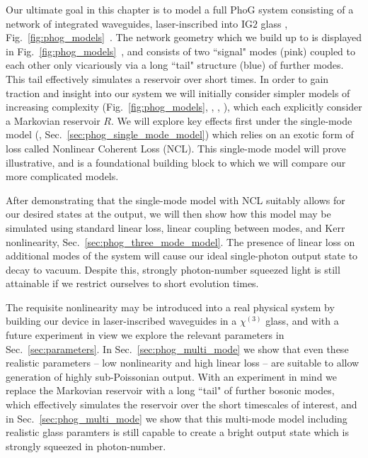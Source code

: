 Our ultimate goal in this chapter is to model a full PhoG system consisting of a network of integrated waveguides, laser-inscribed into IG$2$ glass \cite{ig2}, Fig.~\ref{fig:phog_models}~\MakeUppercase{}. The network geometry which we build up to is displayed in Fig.~\ref{fig:phog_models}~\MakeUppercase{}, and consists of two ``signal" modes (pink) coupled to each other only vicariously via a long ``tail" structure (blue) of further modes. This tail effectively simulates a reservoir over short times. In order to gain traction and insight into our system we will initially consider simpler models of increasing complexity (Fig.~\ref{fig:phog_models}, \MakeUppercase{}, \MakeUppercase{}, \MakeUppercase{}), which each explicitly consider a Markovian reservoir $R$. We will explore key effects first under the single-mode model (\MakeUppercase{}, Sec.~\ref{sec:phog_single_mode_model}) which relies on an exotic form of loss called Nonlinear Coherent Loss (NCL). This single-mode model will prove illustrative, and is a foundational building block to which we will compare our more complicated models.


After demonstrating that the single-mode model with NCL suitably allows for our desired states at the output, we will then show how this model may be simulated using standard linear loss, linear coupling between modes, and Kerr nonlinearity, Sec.~\ref{sec:phog_three_mode_model}. The presence of linear loss on additional modes of the system will cause our ideal single-photon output state to decay to vacuum. Despite this, strongly photon-number squeezed light is still attainable if we restrict ourselves to short evolution times. 

The requisite nonlinearity may be introduced into a real physical system by building our device in laser-inscribed waveguides in a $\chi^{\left(3\right)}$ glass, and with a future experiment in view we explore the relevant parameters in Sec.~\ref{sec:parameters}. In Sec.~\ref{sec:phog_multi_mode} we show that even these realistic parameters -- low nonlinearity and high linear loss -- are suitable to allow generation of highly sub-Poissonian output. With an experiment in mind we replace the Markovian reservoir with a long ``tail" of further bosonic modes, which effectively simulates the reservoir over the short timescales of interest, and in Sec.~\ref{sec:phog_multi_mode} we show that this multi-mode model including realistic glass paramters is still capable to create a bright output state which is strongly squeezed in photon-number.

